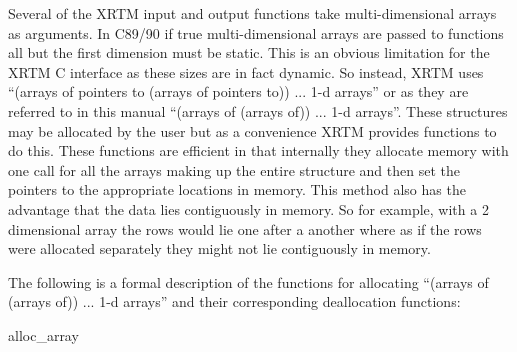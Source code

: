 %
\label{xrtm_c_interface_arrays_of_arrays_of_arrays}

Several of the XRTM input and output functions take multi-dimensional arrays as arguments.  In C89/90 if true multi-dimensional arrays are passed to functions all but the first dimension must be static.  This is an obvious limitation for the XRTM C interface as these sizes are in fact dynamic.  So instead, XRTM uses ``(arrays of pointers to (arrays of pointers to)) ... 1-d arrays'' or as they are referred to in this manual ``(arrays of (arrays of)) ... 1-d arrays''.  These structures may be allocated by the user but as a convenience XRTM provides functions to do this.  These functions are efficient in that internally they allocate memory with one call for all the arrays making up the entire structure and then set the pointers to the appropriate locations in memory.  This method also has the advantage that the data lies contiguously in memory.  So for example, with a 2 dimensional array the rows would lie one after a another where as if the rows were allocated separately they might not lie contiguously in memory.

The following is a formal description of the functions for allocating ``(arrays of (arrays of)) ... 1-d arrays'' and their corresponding deallocation functions:

\begin{prototype}{alloc_array}
\end{prototype}


